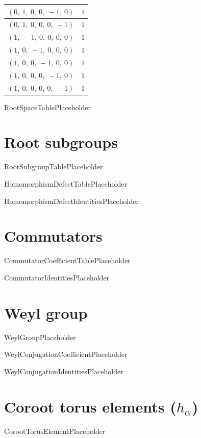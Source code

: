\documentclass[11pt]{article}
\theoremstyle{definition}
\begin{document}
\begin{center}
\begin{tabular}{|l|c|}
\hline
$\left( 0, \  1, \  0, \  0, \  -1, \  0\right)$ & $1$ \\
\hline
$\left( 0, \  1, \  0, \  0, \  0, \  -1\right)$ & $1$ \\
\hline
$\left( 1, \  -1, \  0, \  0, \  0, \  0\right)$ & $1$ \\
\hline
$\left( 1, \  0, \  -1, \  0, \  0, \  0\right)$ & $1$ \\
\hline
$\left( 1, \  0, \  0, \  -1, \  0, \  0\right)$ & $1$ \\
\hline
$\left( 1, \  0, \  0, \  0, \  -1, \  0\right)$ & $1$ \\
\hline
$\left( 1, \  0, \  0, \  0, \  0, \  -1\right)$ & $1$ \\
\hline
\end{tabular}\end{center}

RootSpaceTablePlaceholder

\section{Root subgroups}

RootSubgroupTablePlaceholder

HomomorphismDefectTablePlaceholder

HomomorphismDefectIdentitiesPlaceholder

\section{Commutators}

CommutatorCoefficientTablePlaceholder

CommutatorIdentitiesPlaceholder

\section{Weyl group}

WeylGroupPlaceholder

WeylConjugationCoefficientPlaceholder

WeylConjugationIdentitiesPlaceholder

\section{Coroot torus elements ($h_\alpha$)}

CorootTorusElementPlaceholder
\end{document}
